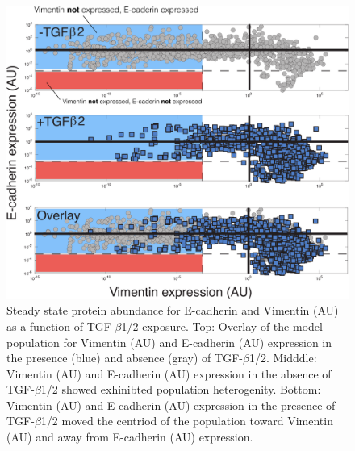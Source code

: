 \begin{figure}
\includegraphics [width=1.0\linewidth] {./figs/Fig-9-Supplemental-RawExpression_v2.pdf}
\caption{Steady state protein abundance for E-cadherin and Vimentin (AU) as a function of TGF-$\beta$1/2 exposure.
Top: Overlay of the model population for Vimentin (AU) and E-cadherin (AU) expression in the presence (blue) and absence (gray) of TGF-$\beta$1/2.
Midddle: Vimentin (AU) and E-cadherin (AU) expression in the absence of TGF-$\beta$1/2 showed exhinibted population heterogenity.
Bottom: Vimentin (AU) and E-cadherin (AU) expression in the presence of TGF-$\beta$1/2 moved the centriod of the population toward Vimentin (AU) and away from E-cadherin (AU) expression.}\label{fig:S9}
\end{figure}

%
